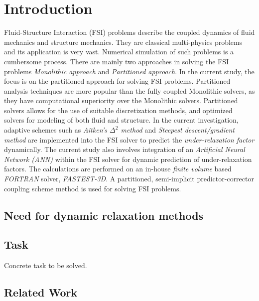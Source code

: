 %
% 


\chapter{Introduction}
Fluid-Structure Interaction (FSI) problems describe the coupled dynamics of fluid mechanics and structure mechanics. They are classical multi-physics problems and its application is very vast. Numerical simulation of such problems is a cumbersome process. There are mainly two approaches in solving the FSI problems \textit{Monolithic approach} and \textit{Partitioned approach}. In the current study, the focus is on the partitioned approach for solving FSI problems. Partitioned analysis techniques are more popular than the fully coupled Monolithic solvers, as they have computational superiority over the Monolithic solvers. Partitioned solvers allows for the use of suitable discretization methods, and optimized solvers for modeling of both fluid and structure. In the current investigation, adaptive schemes such as \textit{Aitken's $\Delta^2$ method} and \textit{Steepest descent/gradient method} are implemented into the FSI solver to predict the \textit{under-relaxation factor} dynamically.  The current study also involves integration of an \textit{Artificial Neural Network (ANN)} within the FSI solver for dynamic prediction of under-relaxation factors. The calculations are performed on an in-house \textit{finite volume} based \textit{FORTRAN} solver, \textit{FASTEST-3D}. A partitioned, semi-implicit predictor-corrector coupling scheme method is used for solving FSI problems. 

\section{Need for dynamic relaxation methods}


\section{Task}

Concrete task to be solved. 



\section{Related Work}

